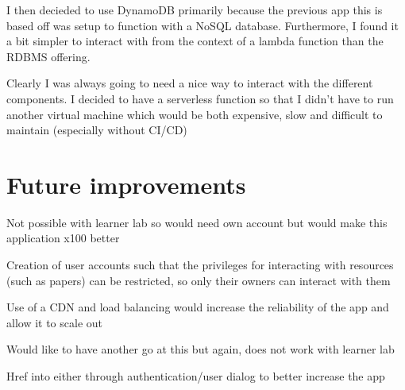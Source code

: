 \documentclass[12pt]{article}
\begin{document}
I then decieded to use DynamoDB primarily because the previous app this is based off was setup to function with a NoSQL database. Furthermore, I found it a bit simpler to interact with from the context of a lambda function than the RDBMS offering.

Clearly I was always going to need a nice way to interact with the different components. I decided to have a serverless function so that I didn't have to run another virtual machine which would be both expensive, slow and difficult to maintain (especially without CI/CD)



\section{Future improvements}

Not possible with learner lab so would need own account but would make this application x100 better

Creation of user accounts such that the privileges for interacting with resources (such as papers) can be restricted, so only their owners can interact with them

Use of a CDN and load balancing would increase the reliability of the app and allow it to scale out 

Would like to have another go at this but again, does not work with learner lab

Href into either through authentication/user dialog to better increase the app 

\end{document}
